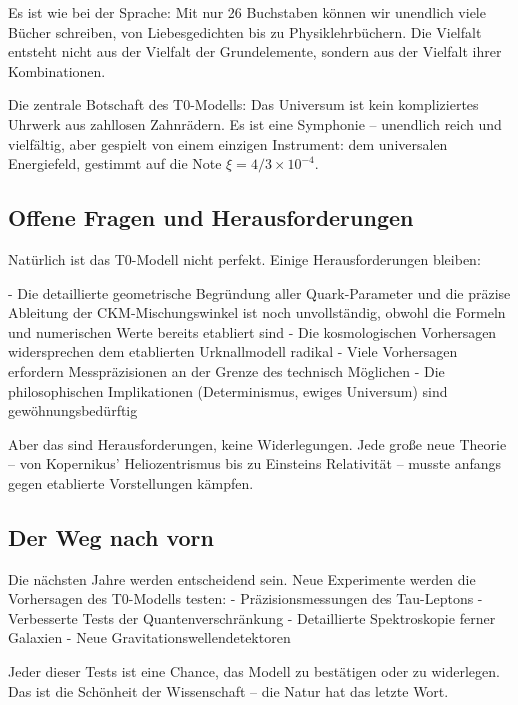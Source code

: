 \documentclass[12pt,a4paper]{article}
\newcommand{\xipar}{\ensuremath{\xi}}
\begin{document}
	Es ist wie bei der Sprache: Mit nur 26 Buchstaben können wir unendlich viele Bücher schreiben, von Liebesgedichten bis zu Physiklehrbüchern. Die Vielfalt entsteht nicht aus der Vielfalt der Grundelemente, sondern aus der Vielfalt ihrer Kombinationen.
	
	\begin{important}
		Die zentrale Botschaft des T0-Modells: 
		Das Universum ist kein kompliziertes Uhrwerk aus zahllosen Zahnrädern. Es ist eine Symphonie -- unendlich reich und vielfältig, aber gespielt von einem einzigen Instrument: dem universalen Energiefeld, gestimmt auf die Note $\xipar = 4/3 \times 10^{-4}$.
	\end{important}
	
	\subsection{Offene Fragen und Herausforderungen}
	
	Natürlich ist das T0-Modell nicht perfekt. Einige Herausforderungen bleiben:
	
	- Die detaillierte geometrische Begründung aller Quark-Parameter und die präzise Ableitung der CKM-Mischungswinkel ist noch unvollständig, obwohl die Formeln und numerischen Werte bereits etabliert sind
	- Die kosmologischen Vorhersagen widersprechen dem etablierten Urknallmodell radikal
	- Viele Vorhersagen erfordern Messpräzisionen an der Grenze des technisch Möglichen
	- Die philosophischen Implikationen (Determinismus, ewiges Universum) sind gewöhnungsbedürftig
	
	Aber das sind Herausforderungen, keine Widerlegungen. Jede große neue Theorie -- von Kopernikus' Heliozentrismus bis zu Einsteins Relativität -- musste anfangs gegen etablierte Vorstellungen kämpfen.
	
	\subsection{Der Weg nach vorn}
	
	Die nächsten Jahre werden entscheidend sein. Neue Experimente werden die Vorhersagen des T0-Modells testen:
	- Präzisionsmessungen des Tau-Leptons
	- Verbesserte Tests der Quantenverschränkung
	- Detaillierte Spektroskopie ferner Galaxien
	- Neue Gravitationswellendetektoren
	
	Jeder dieser Tests ist eine Chance, das Modell zu bestätigen oder zu widerlegen. Das ist die Schönheit der Wissenschaft -- die Natur hat das letzte Wort.
	
\end{document}
